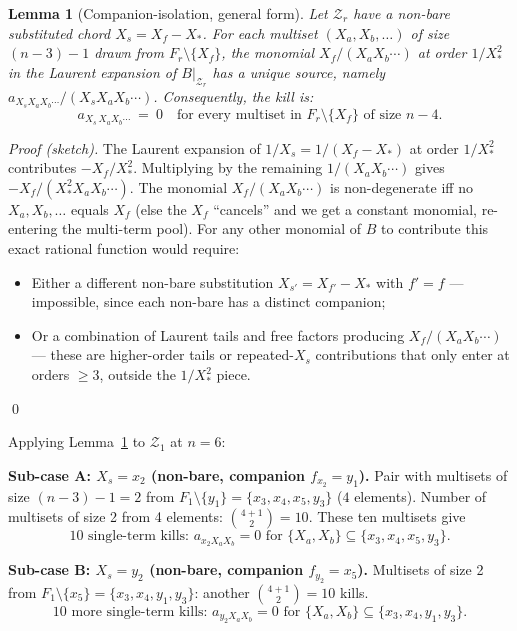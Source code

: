 \documentclass[11pt]{article}
\newcommand{\Z}{\mathcal{Z}}
\newtheorem{lemma}{Lemma}
\theoremstyle{definition}
\begin{document}
\begin{lemma}[Companion-isolation, general form]
\label{lem:companion-isolation-general}
Let $\Z_r$ have a non-bare substituted chord $X_s = X_f - X_*$. For each
multiset $(X_a, X_b, \ldots)$ of size $(n-3)-1$ drawn from $F_r \setminus \{X_f\}$,
the monomial $X_f/(X_a X_b\cdots)$ at order $1/X_*^2$ in the Laurent
expansion of $B|_{\Z_r}$ has a unique source, namely
$a_{X_s X_a X_b \cdots}/(X_s X_a X_b\cdots)$. Consequently, the kill is:
\[
a_{X_s\,X_a X_b\cdots}\ =\ 0
\quad\text{for every multiset in }F_r\setminus\{X_f\}\text{ of size }n-4.
\]
\end{lemma}

\emph{Proof (sketch).} The Laurent expansion of $1/X_s=1/(X_f-X_*)$ at
order $1/X_*^2$ contributes $-X_f/X_*^2$. Multiplying by the remaining
$1/(X_a X_b\cdots)$ gives $-X_f/(X_*^2 X_a X_b\cdots)$. The monomial
$X_f/(X_a X_b\cdots)$ is non-degenerate iff no $X_a, X_b, \ldots$ equals
$X_f$ (else the $X_f$ ``cancels'' and we get a constant monomial,
re-entering the multi-term pool). For any other monomial of $B$ to
contribute this exact rational function would require:
\begin{itemize}[nosep,leftmargin=2em]
\item Either a different non-bare substitution $X_{s'}=X_{f'}-X_*$ with
$f'=f$ --- impossible, since each non-bare has a distinct companion;
\item Or a combination of Laurent tails and free factors producing
$X_f/(X_a X_b \cdots)$ --- these are higher-order tails or repeated-$X_s$
contributions that only enter at orders $\ge 3$, outside the $1/X_*^2$ piece.
\end{itemize}
\qed

Applying Lemma~\ref{lem:companion-isolation-general} to $\Z_1$ at $n=6$:

\textbf{Sub-case A: $X_s = x_2$ (non-bare, companion $f_{x_2}=y_1$).}
Pair with multisets of size $(n-3)-1 = 2$ from $F_1\setminus\{y_1\}=\{x_3,x_4,x_5,y_3\}$
($4$ elements). Number of multisets of size 2 from 4 elements:
$\binom{4+1}{2}=10$. These ten multisets give
\[
\boxed{10\text{ single-term kills: }a_{x_2 X_a X_b} = 0 \text{ for } \{X_a,X_b\}\subseteq\{x_3,x_4,x_5,y_3\}.}
\]

\textbf{Sub-case B: $X_s = y_2$ (non-bare, companion $f_{y_2}=x_5$).}
Multisets of size 2 from $F_1\setminus\{x_5\}=\{x_3,x_4,y_1,y_3\}$:
another $\binom{4+1}{2}=10$ kills.
\[
\boxed{10\text{ more single-term kills: }a_{y_2 X_a X_b} = 0 \text{ for } \{X_a,X_b\}\subseteq\{x_3,x_4,y_1,y_3\}.}
\]
\end{document}
